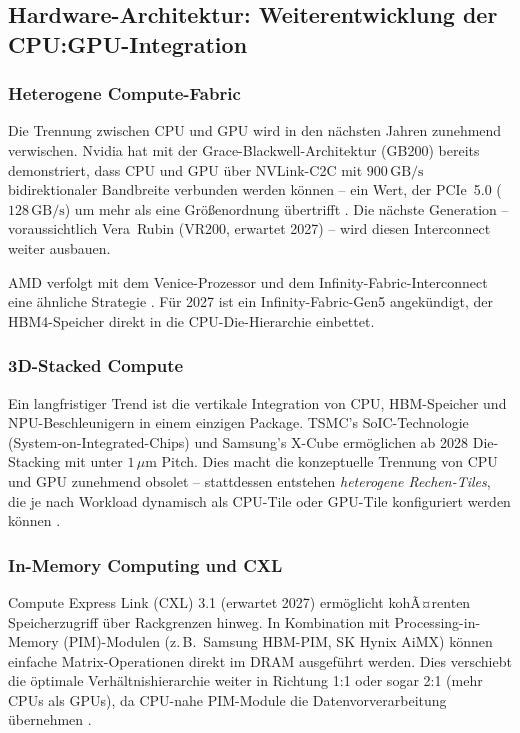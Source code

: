 ﻿\documentclass[a4paper,12pt]{article}
\theoremstyle{definition}
\begin{document}
\subsection{Hardware-Architektur: Weiterentwicklung der CPU:GPU-Integration}

\subsubsection{Heterogene Compute-Fabric}

Die Trennung zwischen CPU und GPU wird in den n\"achsten Jahren zunehmend
verwischen. Nvidia hat mit der Grace-Blackwell-Architektur (GB200) bereits
demonstriert, dass CPU und GPU \"uber NVLink-C2C mit $900\,\text{GB/s}$
bidirektionaler Bandbreite verbunden werden k\"onnen -- ein Wert, der
PCIe~5.0 ($128\,\text{GB/s}$) um mehr als eine Gr\"o\ss enordnung \"ubertrifft
\cite{nvidia2024gb200}. Die n\"achste Generation -- voraussichtlich Vera~Rubin
(VR200, erwartet 2027) -- wird diesen Interconnect weiter ausbauen.

AMD verfolgt mit dem Venice-Prozessor und dem Infinity-Fabric-Interconnect
eine \"ahnliche Strategie \cite{computerbase2026}. F\"ur 2027 ist ein
Infinity-Fabric-Gen5 angek\"undigt, der HBM4-Speicher direkt in die
CPU-Die-Hierarchie einbettet.

\subsubsection{3D-Stacked Compute}

Ein langfristiger Trend ist die vertikale Integration von CPU, HBM-Speicher
und NPU-Beschleunigern in einem einzigen Package. TSMC's SoIC-Technologie
(System-on-Integrated-Chips) und Samsung's X-Cube erm\"oglichen ab 2028
Die-Stacking mit unter $1\,\mu\text{m}$ Pitch. Dies macht die konzeptuelle
Trennung von CPU und GPU zunehmend obsolet -- stattdessen entstehen
\emph{heterogene Rechen-Tiles}, die je nach Workload dynamisch als
CPU-Tile oder GPU-Tile konfiguriert werden k\"onnen \cite{tsmc2025soic}.

\subsubsection{In-Memory Computing und CXL}

Compute Express Link (CXL) 3.1 (erwartet 2027) erm\"oglicht kohÃ¤renten
Speicherzugriff \"uber Rackgrenzen hinweg. In Kombination mit
Processing-in-Memory (PIM)-Modulen (z.\,B.\ Samsung HBM-PIM, SK Hynix
AiMX) k\"onnen einfache Matrix-Operationen direkt im DRAM ausgef\"uhrt
werden. Dies verschiebt die \"optimale Verh\"altnishierarchie weiter in
Richtung 1:1 oder sogar 2:1 (mehr CPUs als GPUs), da CPU-nahe
PIM-Module die Datenvorverarbeitung \"ubernehmen \cite{cxl2024spec}.
\end{document}
